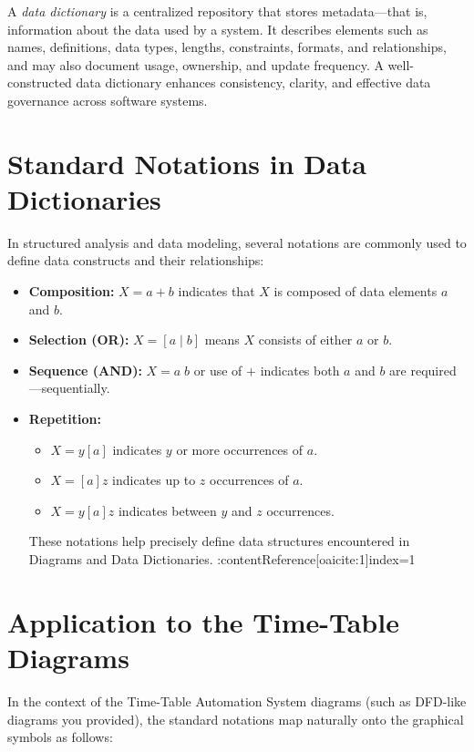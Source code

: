 \documentclass[12pt]{article}
\begin{document}
A \emph{data dictionary} is a centralized repository that stores metadata—that is, information about the data used by a system. It describes elements such as names, definitions, data types, lengths, constraints, formats, and relationships, and may also document usage, ownership, and update frequency. A well-constructed data dictionary enhances consistency, clarity, and effective data governance across software systems. 

\section{Standard Notations in Data Dictionaries}

In structured analysis and data modeling, several notations are commonly used to define data constructs and their relationships:

\begin{itemize}[label=\textbullet]
    \item \textbf{Composition:} \(X = a + b\) indicates that \(X\) is composed of data elements \(a\) and \(b\).
    \item \textbf{Selection (OR):} \(X = [a \mid b]\) means \(X\) consists of either \(a\) or \(b\).
    \item \textbf{Sequence (AND):} \(X = a\; b\) or use of \(+\) indicates both \(a\) and \(b\) are required—sequentially.
    \item \textbf{Repetition:} 
    \begin{itemize}
        \item \(X = y[a]\) indicates \(y\) or more occurrences of \(a\).
        \item \(X = [a]z\) indicates up to \(z\) occurrences of \(a\).
        \item \(X = y[a]z\) indicates between \(y\) and \(z\) occurrences.
    \end{itemize}
    These notations help precisely define data structures encountered in Diagrams and Data Dictionaries. :contentReference[oaicite:1]{index=1}
\end{itemize}

\section{Application to the Time-Table Diagrams}

In the context of the Time-Table Automation System diagrams (such as DFD-like diagrams you provided), the standard notations map naturally onto the graphical symbols as follows:
\end{document}
